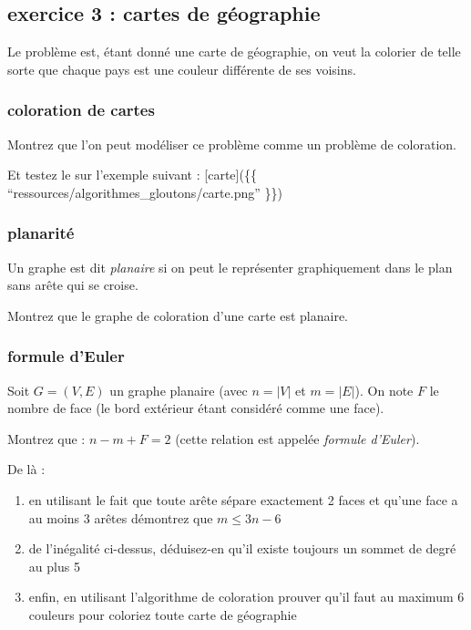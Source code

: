 \documentclass[
]{article}
\providecommand{\tightlist}{%
  \setlength{\itemsep}{0pt}\setlength{\parskip}{0pt}}
\begin{document}
\hypertarget{exercice-3-cartes-de-guxe9ographie}{%
\subsection{exercice 3 : cartes de
géographie}\label{exercice-3-cartes-de-guxe9ographie}}

Le problème est, étant donné une carte de géographie, on veut la
colorier de telle sorte que chaque pays est une couleur différente de
ses voisins.

\hypertarget{coloration-de-cartes}{%
\subsubsection{coloration de cartes}\label{coloration-de-cartes}}

Montrez que l'on peut modéliser ce problème comme un problème de
coloration.

Et testez le sur l'exemple suivant : {[}carte{]}(\{\{
``ressources/algorithmes\_gloutons/carte.png'' \}\})

\hypertarget{planarituxe9}{%
\subsubsection{planarité}\label{planarituxe9}}

Un graphe est dit \emph{planaire} si on peut le représenter
graphiquement dans le plan sans arête qui se croise.

Montrez que le graphe de coloration d'une carte est planaire.

\hypertarget{formule-deuler}{%
\subsubsection{formule d'Euler}\label{formule-deuler}}

Soit \(G = (V, E)\) un graphe planaire (avec \(n = \vert V \vert\) et
\(m = \vert E \vert\)). On note \(F\) le nombre de face (le bord
extérieur étant considéré comme une face).

Montrez que : \(n - m + F = 2\) (cette relation est appelée
\emph{formule d'Euler}).

De là :

\begin{enumerate}
\def\labelenumi{\arabic{enumi}.}
\tightlist
\item
  en utilisant le fait que toute arête sépare exactement 2 faces et
  qu'une face a au moins 3 arêtes démontrez que \(m\leq 3n - 6\)
\item
  de l'inégalité ci-dessus, déduisez-en qu'il existe toujours un sommet
  de degré au plus 5
\item
  enfin, en utilisant l'algorithme de coloration prouver qu'il faut au
  maximum 6 couleurs pour coloriez toute carte de géographie
\end{enumerate}
\end{document}
